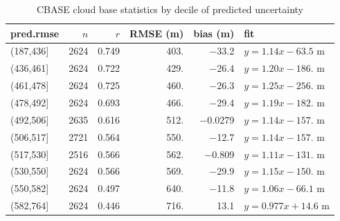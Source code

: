 \documentclass[amt,manuscript]{copernicus}\usepackage[]{graphicx}\usepackage[]{color}
\begin{document}
\begin{table}[t]
  \centering
  \caption{CBASE cloud base statistics by decile of predicted uncertainty}
  \label{tab:rmseclass}
\begin{tabular}{lrrrrl}
  \hline
\hline
pred.rmse & $n$ & $r$ & RMSE (m) & bias (m) & fit \\ 
  \hline
(187,436] & 2624 & 0.749 & 403. & $-$33.2 & $y = 1.14 x - 63.5$ m \\ 
  (436,461] & 2624 & 0.722 & 429. & $-$26.4 & $y = 1.20 x - 186.$ m \\ 
  (461,478] & 2624 & 0.725 & 460. & $-$26.3 & $y = 1.25 x - 256.$ m \\ 
  (478,492] & 2624 & 0.693 & 466. & $-$29.4 & $y = 1.19 x - 182.$ m \\ 
  (492,506] & 2635 & 0.616 & 512. & $-$0.0279 & $y = 1.14 x - 157.$ m \\ 
  (506,517] & 2721 & 0.564 & 550. & $-$12.7 & $y = 1.14 x - 157.$ m \\ 
  (517,530] & 2516 & 0.566 & 562. & $-$0.809 & $y = 1.11 x - 131.$ m \\ 
  (530,550] & 2624 & 0.566 & 569. & $-$29.9 & $y = 1.15 x - 150.$ m \\ 
  (550,582] & 2624 & 0.497 & 640. & $-$11.8 & $y = 1.06 x - 66.1$ m \\ 
  (582,764] & 2624 & 0.446 & 716. & 13.1 & $y = 0.977 x + 14.6$ m \\ 
   \hline
\hline
\end{tabular}

\end{table}
\end{document}
